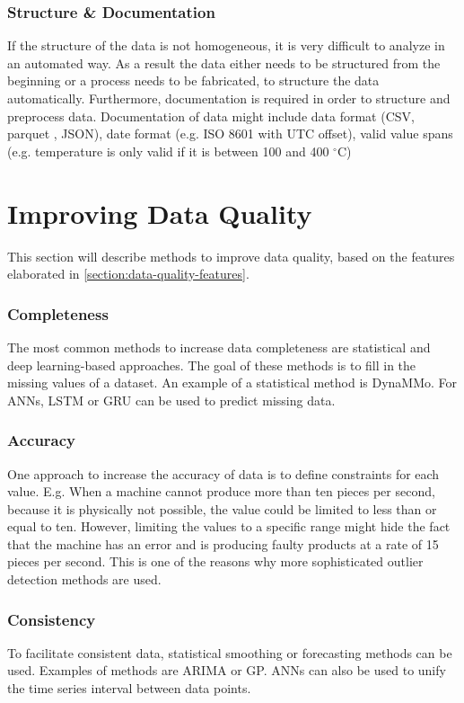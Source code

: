 \subsubsection{Structure \& Documentation}
If the structure of the data is not homogeneous, it is very difficult to analyze in an automated way. As a result the data either needs to be structured from the beginning or a process needs to be fabricated, to structure the data automatically. Furthermore, documentation is required in order to structure and preprocess data. \newline
Documentation of data might include data format (\ac{CSV}, parquet \cite{ApacheParquet2021}, \ac{JSON}), date format (e.g. ISO 8601 with UTC offset), valid value spans (e.g. temperature is only valid if it is between 100 and 400 $^{\circ}$C)
\cite{caiChallengesDataQuality2015}

\section{Improving Data Quality}\label{section:imrpoving-data-quality}
This section will describe methods to improve data quality, based on the features elaborated in \autoref{section:data-quality-features}.
\subsubsection{Completeness}
The most common methods to increase data completeness are statistical and deep learning-based approaches. The goal of these methods is to fill in the missing values of a dataset. An example of a statistical method is DynaMMo\cite{liDynaMMoMiningSummarization2009}. For \acp{ANN}, \ac{LSTM} or \ac{GRU} can be used to predict missing data. \cite{songIoTDataQuality2020}
\subsubsection{Accuracy}
One approach to increase the accuracy of data is to define constraints for each value. E.g. When a machine cannot produce more than ten pieces per second, because it is physically not possible, the value could be limited to less than or equal to ten. However, limiting the values to a specific range might hide the fact that the machine  has an error and is producing faulty products at a rate of 15 pieces per second. This is one of the reasons why more sophisticated outlier detection methods are used. \cite{songIoTDataQuality2020}

\subsubsection{Consistency}
To facilitate consistent data, statistical smoothing or forecasting methods can be used. Examples of methods are \ac{ARIMA} or \ac{GP}. \acp{ANN} can also be used to unify the time series interval between data points. \cite{songIoTDataQuality2020}

